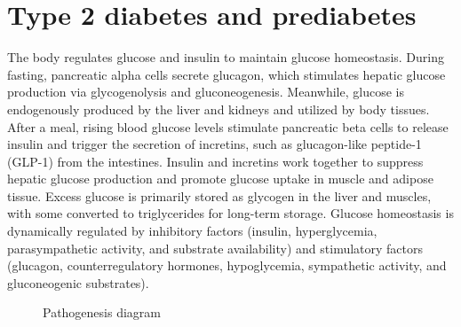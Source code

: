 \documentclass[
  a4paper,
  headsepline=true,
  open=any]{scrbook}
\begin{document}
\hypertarget{type-2-diabetes-and-prediabetes}{%
\chapter{Type 2 diabetes and
prediabetes}\label{type-2-diabetes-and-prediabetes}}

The body regulates glucose and insulin to maintain glucose homeostasis.
During fasting, pancreatic alpha cells secrete glucagon, which
stimulates hepatic glucose production via glycogenolysis and
gluconeogenesis. Meanwhile, glucose is endogenously produced by the
liver and kidneys and utilized by body tissues. After a meal, rising
blood glucose levels stimulate pancreatic beta cells to release insulin
and trigger the secretion of incretins, such as glucagon-like peptide-1
(GLP-1) from the intestines. Insulin and incretins work together to
suppress hepatic glucose production and promote glucose uptake in muscle
and adipose tissue. Excess glucose is primarily stored as glycogen in
the liver and muscles, with some converted to triglycerides for
long-term storage. Glucose homeostasis is dynamically regulated by
inhibitory factors (insulin, hyperglycemia, parasympathetic activity,
and substrate availability) and stimulatory factors (glucagon,
counterregulatory hormones, hypoglycemia, sympathetic activity, and
gluconeogenic substrates).

\begin{figure}

\begin{minipage}[t]{\linewidth}

{\centering 


\caption{Pathogenesis diagram}

}

\end{minipage}%

\end{figure}
\end{document}
